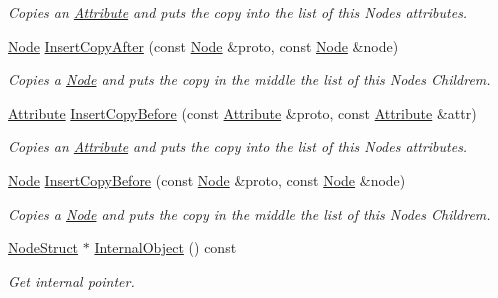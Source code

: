 \begin{DoxyCompactItemize}
\begin{DoxyCompactList}\small\item\em Copies an \hyperlink{classphys_1_1xml_1_1Attribute}{Attribute} and puts the copy into the list of this Nodes attributes. \item\end{DoxyCompactList}\item 
\hyperlink{classphys_1_1xml_1_1Node}{Node} \hyperlink{classphys_1_1xml_1_1Node_a335c643bed6d4527191234fa773450e4}{InsertCopyAfter} (const \hyperlink{classphys_1_1xml_1_1Node}{Node} \&proto, const \hyperlink{classphys_1_1xml_1_1Node}{Node} \&node)
\begin{DoxyCompactList}\small\item\em Copies a \hyperlink{classphys_1_1xml_1_1Node}{Node} and puts the copy in the middle the list of this Nodes Childrem. \item\end{DoxyCompactList}\item 
\hyperlink{classphys_1_1xml_1_1Attribute}{Attribute} \hyperlink{classphys_1_1xml_1_1Node_a1491dda93107e3b3ea095e717698e587}{InsertCopyBefore} (const \hyperlink{classphys_1_1xml_1_1Attribute}{Attribute} \&proto, const \hyperlink{classphys_1_1xml_1_1Attribute}{Attribute} \&attr)
\begin{DoxyCompactList}\small\item\em Copies an \hyperlink{classphys_1_1xml_1_1Attribute}{Attribute} and puts the copy into the list of this Nodes attributes. \item\end{DoxyCompactList}\item 
\hyperlink{classphys_1_1xml_1_1Node}{Node} \hyperlink{classphys_1_1xml_1_1Node_a97aec2d259e46d180ef1cde6554b0b73}{InsertCopyBefore} (const \hyperlink{classphys_1_1xml_1_1Node}{Node} \&proto, const \hyperlink{classphys_1_1xml_1_1Node}{Node} \&node)
\begin{DoxyCompactList}\small\item\em Copies a \hyperlink{classphys_1_1xml_1_1Node}{Node} and puts the copy in the middle the list of this Nodes Childrem. \item\end{DoxyCompactList}\item 
\hyperlink{classNodeStruct}{NodeStruct} $\ast$ \hyperlink{classphys_1_1xml_1_1Node_a0d2c64c909e7545d01b586fe9d0bd9d4}{InternalObject} () const 
\begin{DoxyCompactList}\small\item\em Get internal pointer. \item\end{DoxyCompactList}\item 

\end{DoxyCompactItemize}
